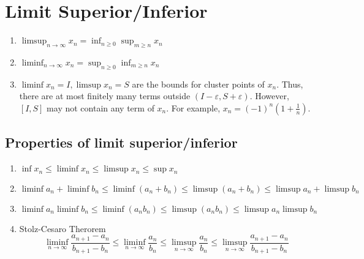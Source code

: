 \section{Limit Superior/Inferior}
\begin{enumerate}
	\item $\displaystyle \limsup_{n \to \infty} x_n = \inf_{n \ge 0} \sup_{m \ge n} x_n $
	\item $ \displaystyle \liminf_{n \to \infty} x_n = \sup_{n \ge 0} \inf_{m \ge n} x_n $
	\item $\liminf x_n  = I,\limsup x_n = S$ are the bounds for cluster points of $x_n$.
	Thus, there are at most finitely many terms outside $(I-\varepsilon,S+\varepsilon)$.
	However, $[I,S]$ may not contain any term of $x_n$.
	For example, $x_n = (-1)^n (1+\frac{1}{n})$.
\end{enumerate}

\subsection{Properties of limit superior/inferior}
\begin{enumerate}
	\item $\inf x_n \le \liminf x_n \le \limsup x_n \le \sup x_n $
	\item $ \liminf a_n + \liminf b_n \le \liminf (a_n+b_n) \le \limsup (a_n + b_n) \le \limsup a_n + \limsup b_n $ 
	\item $ \liminf a_n \liminf b_n \le \liminf (a_n b_n) \le \limsup (a_n b_n) \le \limsup a_n \limsup b_n  $
	\item Stolz-Cesaro Therorem
		\[ \liminf_{n \to \infty} \frac{a_{n+1}-a_n}{b_{n+1}-b_n} \le \liminf_{n \to \infty} \frac{a_n}{b_n} \le \limsup_{n \to \infty} \frac{a_n}{b_n} \le \limsup_{n \to \infty} \frac{a_{n+1}-a_n}{b_{n+1}-b_n} \]
\end{enumerate}

